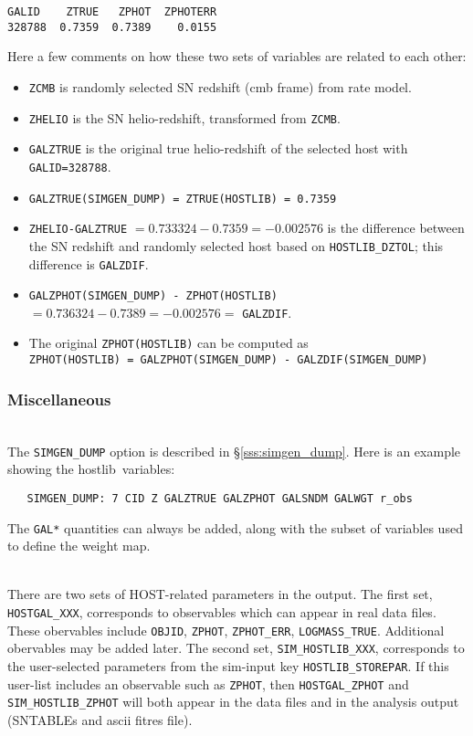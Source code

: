 \documentclass[12pt]{article}
\newcommand{\hostlib}{{\sc hostlib}}
\begin{document}
{\begin{verbatim}
GALID    ZTRUE   ZPHOT  ZPHOTERR
328788  0.7359  0.7389    0.0155
\end{verbatim}
Here a few comments on how these two sets of variables are related
to each other:
\begin{itemize}[noitemsep]
  \item {\tt ZCMB} is randomly selected SN redshift (cmb frame) 
           from rate model.
%
  \item {\tt ZHELIO} is the SN helio-redshift, transformed from {\tt ZCMB}.
%
  \item {\tt GALZTRUE} is the original true helio-redshift of the 
            selected host with {\tt GALID=328788}.
%
  \item {\tt GALZTRUE(SIMGEN\_DUMP) = ZTRUE(HOSTLIB) = 0.7359}
%
  \item {\tt ZHELIO-GALZTRUE} $= 0.733324 - 0.7359 = -0.002576$
      is the difference between the SN redshift and randomly selected 
      host based on {\tt HOSTLIB\_DZTOL}; 
      this difference is {\tt GALZDIF}.
%
  \item {\tt GALZPHOT(SIMGEN\_DUMP) - ZPHOT(HOSTLIB)}
        $= 0.736324 - 0.7389 = -0.002576=$ {\tt GALZDIF}.
%
  \item  The original {\tt ZPHOT(HOSTLIB)} can be  computed as \\
       {\tt ZPHOT(HOSTLIB) = GALZPHOT(SIMGEN\_DUMP) - GALZDIF(SIMGEN\_DUMP)}
\end{itemize}


\clearpage
\subsubsection{Miscellaneous}
\label{sss:hostlib_misc}

 \\
The {\tt SIMGEN\_DUMP} option is described in 
\S\ref{sss:simgen_dump}. Here is an example showing
the \hostlib\ variables:
\begin{verbatim}
   SIMGEN_DUMP: 7 CID Z GALZTRUE GALZPHOT GALSNDM GALWGT r_obs
\end{verbatim}
%
The {\tt GAL*} quantities can always be added,
along with the subset of variables used to define
the weight map. 


\bigskip
{} \\
There are two sets of HOST-related parameters in the output.
The first set, {\tt HOSTGAL\_XXX}, corresponds to observables
which can appear in real data files. These obervables include
{\tt OBJID}, {\tt ZPHOT}, {\tt ZPHOT\_ERR}, {\tt LOGMASS\_TRUE}.
Additional obervables may be added later.  The second set,
{\tt SIM\_HOSTLIB\_XXX}, corresponds to the user-selected
parameters from the sim-input key {\tt HOSTLIB\_STOREPAR}.
If this user-list includes an observable such as {\tt ZPHOT},
then {\tt HOSTGAL\_ZPHOT} and {\tt SIM\_HOSTLIB\_ZPHOT} 
will both appear in the data files and in the 
analysis output (SNTABLEs and ascii fitres file).


}
\end{document}
